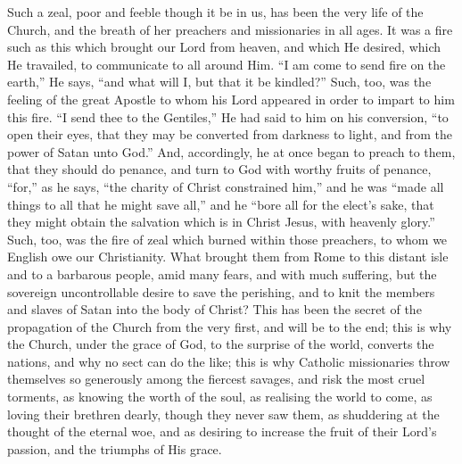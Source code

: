 Such a zeal, poor and feeble though it be in us, has been the very
life of the Church, and the breath of her preachers and missionaries
in all ages. It was a fire such as this which brought our Lord from
heaven, and which He desired, which He travailed, to communicate to
all around Him. ``I am come to send fire on the earth,'' He
says, ``and what will I, but that it be kindled?'' Such, too,
was the feeling of the great Apostle to whom his Lord appeared in
order to impart to him this fire. ``I send thee to the
Gentiles,'' He had said to him on his conversion, ``to open
their eyes, that they may be converted from darkness to light, and
from the power of Satan unto God.'' And, accordingly, he at once
began to preach to them, that they should do penance, and turn to God
with worthy fruits of penance, ``for,'' as he says, ``the
charity of Christ constrained him,'' and he was ``made all
things to all that he might save all,'' and he ``bore all for
the elect's sake, that they might obtain the salvation which is in
Christ Jesus, with heavenly glory.'' Such, too, was the fire of
zeal which burned within those preachers, to whom we English owe our
Christianity. What brought them from Rome to this distant isle and to
a barbarous people, amid many fears, and with much suffering, but the
sovereign uncontrollable desire to save the perishing, and to knit the
members and slaves of Satan into the body of Christ? This has been the
secret of the propagation of the Church from the very first, and will
be to the end; this is why the Church, under the grace of God, to the
surprise of the world, converts the nations, and why no sect can do
the like; this is why Catholic missionaries throw themselves so
generously among the fiercest savages, and risk the most cruel
torments, as knowing the worth of the soul, as realising the world to
come, as loving their brethren dearly, though they never saw them, as
shuddering at the thought of the eternal woe, and as desiring to
increase the fruit of their Lord's passion, and the triumphs of His
grace.

